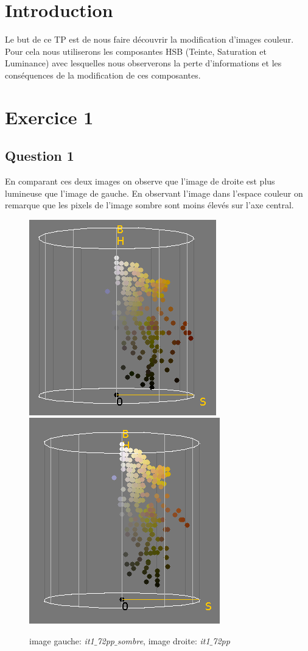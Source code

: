 \documentclass[a4paper,12pt]{report}
\begin{document}


\setcounter{page}{1} 
\newpage

\section*{Introduction}

Le but de ce TP est de nous faire découvrir la modification d'images couleur. Pour cela nous utiliserons les composantes HSB (Teinte, Saturation et Luminance) avec lesquelles nous observerons la perte d'informations et les conséquences de la modification de ces composantes.

\section*{Exercice 1}

\subsection*{Question 1}

En comparant ces deux images on observe que l'image de droite est plus lumineuse que l'image de gauche.  En observant l'image dans l'espace couleur on remarque que les pixels de l'image sombre sont moins élevés sur l'axe central. 

\begin{figure}[!ht]
	\center
	\includegraphics[scale=0.5]{image/q1_1.png}
	\includegraphics[scale=0.48]{image/q1_2.png}
	\caption{image gauche: \textit{it1$\_$72pp$\_$sombre}, image droite: \textit{it1$\_$72pp}}
\end{figure} 
 
\end{document}
